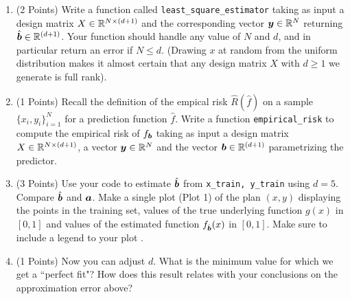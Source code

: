 \documentclass{article}
\newcommand{\bb}{b}
\begin{document}
\begin{enumerate}
\setcounter{enumi}{\value{saveenum}}
    \item (2 Points) Write a function called \texttt{least\_square\_estimator} taking as input a design matrix $X \in {\mathbb{R}}^{N \times (d + 1)}$ and the corresponding vector  $\boldsymbol{y} \in {\mathbb{R}}^N$ returning $\hat{\boldsymbol{b}} \in {\mathbb{R}}^{(d + 1)}$. Your function should handle any value of $N$ and $d$, and in particular return an error if $N \leq d$. (Drawing $x$ at random from the uniform distribution makes it almost certain that any design matrix $X$ with $d \geq 1$ we generate is full rank).
    
    \item (1 Points) Recall the definition of the empical risk $\hat{R}(\hat{f})$ on a sample $\{x_i, y_i\}_{i=1}^N$ for a prediction function $\hat{f}$. Write a function \texttt{empirical\_risk} to compute the empirical risk of $f_{\bs \bb}$ taking as input a design matrix $X \in {\mathbb{R}}^{N \times (d + 1)}$, a vector $\boldsymbol{y} \in {\mathbb{R}}^N$ and the vector  $\bs \bb \in \sR^{(d+1)}$ parametrizing the predictor.
    
    \item (3 Points) Use your code to estimate $\hat{\bs \bb}$ from \texttt{x\_train, y\_train} using $d=5$. Compare $\hat{\boldsymbol{b}}$ and $\boldsymbol{a}$. Make a single plot (Plot 1) of the plan $(x,y)$ displaying the points in the training set, values of the true underlying function $g(x)$ in $[0,1]$ and values of the estimated function $f_{\hat{\bs \bb}}(x)$ in $[0,1]$. Make sure to include a legend to your plot .
    
    \item (1 Points) Now you can adjust $d$. What is the minimum value for which we get a ``perfect fit"? How does this result relates with your conclusions on the approximation error above? 
    
\setcounter{saveenum}{\value{enumi}}    
\end{enumerate}    
\end{document}
